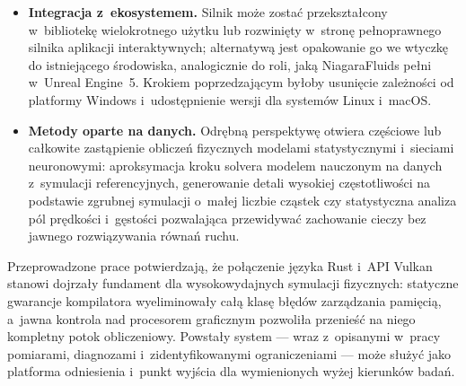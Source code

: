 \begin{itemize}
          pamięci dzielonej i~operacji podgrupowych
          (ang.~\textit{subgroup operations}) w~shaderach solvera.
    \item \textbf{Integracja z~ekosystemem.} Silnik może zostać przekształcony
          w~bibliotekę wielokrotnego użytku lub rozwinięty w~stronę
          pełnoprawnego silnika aplikacji interaktywnych; alternatywą jest
          opakowanie go we wtyczkę do istniejącego środowiska, analogicznie
          do roli, jaką NiagaraFluids pełni w~Unreal Engine~5. Krokiem
          poprzedzającym byłoby usunięcie zależności od platformy Windows
          i~udostępnienie wersji dla systemów Linux i~macOS.
    \item \textbf{Metody oparte na danych.} Odrębną perspektywę otwiera
          częściowe lub całkowite zastąpienie obliczeń fizycznych modelami
          statystycznymi i~sieciami neuronowymi: aproksymacja kroku solvera
          modelem nauczonym na danych z~symulacji referencyjnych, generowanie
          detali wysokiej częstotliwości na podstawie zgrubnej symulacji
          o~małej liczbie cząstek czy statystyczna analiza pól prędkości
          i~gęstości pozwalająca przewidywać zachowanie cieczy bez jawnego
          rozwiązywania równań ruchu.
\end{itemize}

Przeprowadzone prace potwierdzają, że połączenie języka Rust i~API Vulkan
stanowi dojrzały fundament dla wysokowydajnych symulacji fizycznych: statyczne
gwarancje kompilatora wyeliminowały całą klasę błędów zarządzania pamięcią,
a~jawna kontrola nad procesorem graficznym pozwoliła przenieść na niego
kompletny potok obliczeniowy. Powstały system --- wraz z~opisanymi w~pracy
pomiarami, diagnozami i~zidentyfikowanymi ograniczeniami --- może służyć jako
platforma odniesienia i~punkt wyjścia dla wymienionych wyżej kierunków badań.
